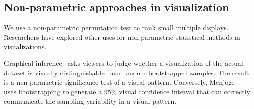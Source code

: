 \subsection{Non-parametric approaches in visualization}
We use a non-parametric permutation test to rank small multiple displays. Researchers have explored other uses for non-parametric statistical methods in visualizations.

Graphical inference~\cite{Buja2009, Wickham2013, Majumder2013} asks viewers to judge whether a visualization of the actual dataset is visually distinguishable from random bootstrapped samples. The result is a non-parametric significance test of a visual pattern. Conversely, Menjoge~\cite{Menjoge2010} uses bootstrapping to generate a 95\% visual confidence interval that can correctly communicate the sampling variability in a visual pattern. 

